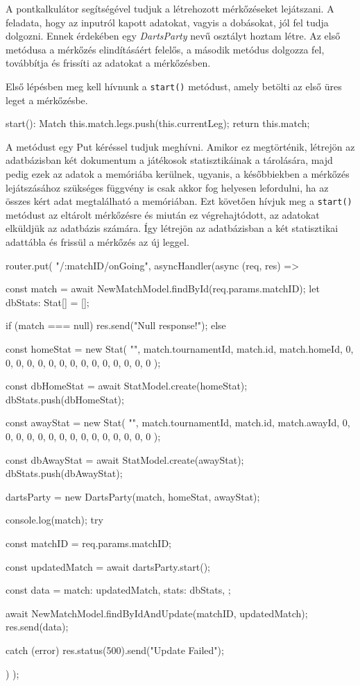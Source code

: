 A pontkalkulátor segítségével tudjuk a létrehozott mérkőzéseket lejátszani. A feladata, hogy az inputról kapott adatokat, vagyis a dobásokat, jól fel tudja dolgozni. Ennek érdekében egy \textit{DartsParty} nevű osztályt hoztam létre. Az első metódusa a mérkőzés elindításáért felelős, a második metódus dolgozza fel, továbbítja és frissíti az adatokat a mérkőzésben.

Első lépésben meg kell hívnunk a \texttt{start()} metódust, amely betölti az első üres leget a mérkőzésbe.
\begin{cpp}
  start(): Match {
    this.match.legs.push(this.currentLeg);
    return this.match;
  }
\end{cpp}

A metódust egy Put kéréssel tudjuk meghívni. Amikor ez megtörténik, létrejön az adatbázisban két dokumentum a játékosok statisztikáinak a tárolására, majd pedig ezek az adatok a memóriába kerülnek, ugyanis, a későbbiekben a mérkőzés lejátszásához szükséges függvény is csak akkor fog helyesen lefordulni, ha az összes kért adat megtalálható a memóriában. Ezt követően hívjuk meg a \texttt{start()} metódust az eltárolt mérkőzésre és miután ez végrehajtódott, az adatokat elküldjük az adatbázis számára. Így létrejön az adatbázisban a két statisztikai adattábla és frissül a mérkőzés az új leggel.

\begin{cpp}
router.put(
  "/:matchID/onGoing",
  asyncHandler(async (req, res) => {
    const match = await NewMatchModel.findById(req.params.matchID);
    let dbStats: Stat[] = [];

    if (match === null) {
      res.send("Null response!");
    } else {
      const homeStat = new Stat(
        "",
        match.tournamentId,
        match.id,
        match.homeId,
        0, 0, 0, 0, 0, 0, 0, 0, 0, 0, 0, 0, 0, 0, 0
      );

      const dbHomeStat = await StatModel.create(homeStat);
      dbStats.push(dbHomeStat);

      const awayStat = new Stat(
        "",
        match.tournamentId,
        match.id,
        match.awayId,
        0, 0, 0, 0, 0, 0, 0, 0, 0, 0, 0, 0, 0, 0, 0
      );

      const dbAwayStat = await StatModel.create(awayStat);
      dbStats.push(dbAwayStat);
      
      dartsParty = new DartsParty(match, homeStat, awayStat);
    }
    
    console.log(match);
    try {
      const matchID = req.params.matchID;

      const updatedMatch = await dartsParty.start();

      const data = {
        match: updatedMatch,
        stats: dbStats,
      };

      await NewMatchModel.findByIdAndUpdate(matchID, updatedMatch);
      res.send(data);
    } catch (error) {
      res.status(500).send("Update Failed");
    }
  })
);
\end{cpp}

